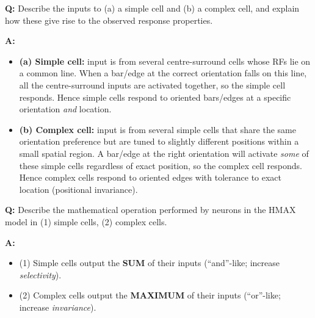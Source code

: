 \begin{exbox}
\textbf{Q:} Describe the inputs to (a) a simple cell and (b) a complex cell, and explain how these give rise to the observed response properties.

\textbf{A:}
\begin{itemize}
  \item \textbf{(a) Simple cell:} input is from several centre-surround cells whose RFs lie on a common line. When a bar/edge at the correct orientation falls on this line, all the centre-surround inputs are activated together, so the simple cell responds. Hence simple cells respond to oriented bars/edges at a specific orientation \emph{and} location.
  \item \textbf{(b) Complex cell:} input is from several simple cells that share the same orientation preference but are tuned to slightly different positions within a small spatial region. A bar/edge at the right orientation will activate \emph{some} of these simple cells regardless of exact position, so the complex cell responds. Hence complex cells respond to oriented edges with tolerance to exact location (positional invariance).
\end{itemize}
\end{exbox}

\begin{exbox}
\textbf{Q:} Describe the mathematical operation performed by neurons in the HMAX model in (1) simple cells, (2) complex cells.

\textbf{A:}
\begin{itemize}
  \item (1) Simple cells output the \textbf{SUM} of their inputs (``and''-like; increase \emph{selectivity}).
  \item (2) Complex cells output the \textbf{MAXIMUM} of their inputs (``or''-like; increase \emph{invariance}).
\end{itemize}
\end{exbox}

